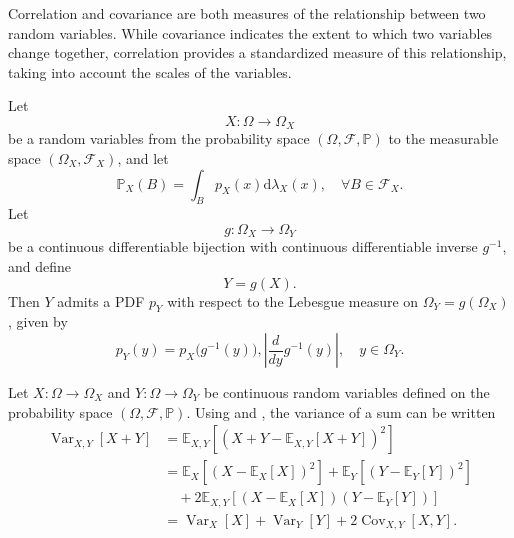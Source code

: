 \begin{remark}
	Correlation and covariance are both measures of the relationship between two random variables. While covariance indicates the extent to which two variables change together, correlation provides a standardized measure of this relationship, taking into account the scales of the variables.
\end{remark}

\begin{definition}
	\label{def:change_of_variables}
	Let
	\begin{equation}
		X\colon \Omega \to \Omega_X
	\end{equation}
	be a random variables from the probability space $(\Omega, \mathcal{F}, \mathbb{P})$ to the measurable space $(\Omega_X, \mathcal{F}_X)$, and let 
	\begin{equation}
		\mathbb{P}_X(B) = \int_B p_X(x)\mathrm{d}\lambda_X(x), \quad \forall B\in \mathcal{F}_X.
	\end{equation}
	Let
	\begin{equation}
		g\colon \Omega_X\to \Omega_Y
	\end{equation}
	be a continuous differentiable bijection with continuous differentiable inverse $g^{-1}$, and define
	\begin{equation}
		Y= g(X).
	\end{equation}
	Then $Y$ admits a PDF $p_Y$ with respect to the Lebesgue measure on $\Omega_Y = g(\Omega_X)$, given by~\cite{Sivia2006}
	\begin{equation}
		p_Y(y) = p_X\bigl(g^{-1}(y)\bigr), \left| \frac{d}{dy} g^{-1}(y) \right|, \quad y \in \Omega_Y.
	\end{equation}
\end{definition}

\begin{example}
	Let $X\colon \Omega \to \Omega_X$ and $Y\colon\Omega \to \Omega_Y$ be continuous random variables defined on the probability space $(\Omega, \mathcal{F}, \mathbb{P})$. Using  and , the variance of a sum can be written
	\begin{equation}
		\begin{split}
			\operatorname{Var}_{X,Y}[X+Y] &= \mathbb{E}_{X,Y}[(X+Y-\mathbb{E}_{X,Y}[X+Y])^2]\\
			&= \mathbb{E}_X[(X-\mathbb{E}_X[X])^2]+\mathbb{E}_Y[(Y-\mathbb{E}_Y[Y])^2]\\
			&\quad+2\mathbb{E}_{X,Y}[(X-\mathbb{E}_X[X])(Y-\mathbb{E}_Y[Y])]\\
			& = \operatorname{Var}_X[X]+\operatorname{Var}_Y[Y]+2\operatorname{Cov}_{X,Y}[X,Y].
		\end{split}
	\end{equation}
\end{example}

